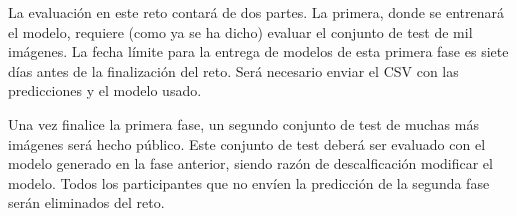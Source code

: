 La evaluación en este reto contará de dos partes. La primera, donde se entrenará el modelo, requiere (como ya se ha dicho) evaluar el conjunto de test de mil imágenes. La fecha límite para la entrega de modelos de esta primera fase es siete días antes de la finalización del reto. Será necesario enviar el CSV con las predicciones y el modelo usado.

Una vez finalice la primera fase, un segundo conjunto de test de muchas más imágenes será hecho público. Este conjunto de test deberá ser evaluado con el modelo generado en la fase anterior, siendo razón de descalficación modificar el modelo. Todos los participantes que no envíen la predicción de la segunda fase serán eliminados del reto.
